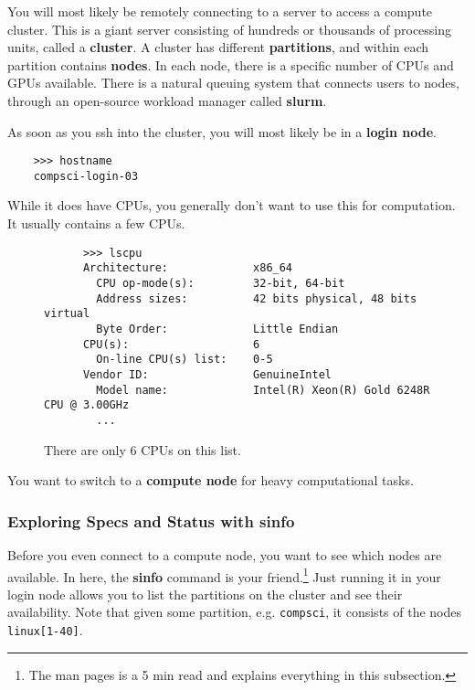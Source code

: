   You will most likely be remotely connecting to a server to access a compute cluster. This is a giant server consisting of hundreds or thousands of processing units, called a \textbf{cluster}. A cluster has different \textbf{partitions}, and within each partition contains \textbf{nodes}. In each node, there is a specific number of CPUs and GPUs available. There is a natural queuing system that connects users to nodes, through an open-source workload manager called \textbf{slurm}. 

  As soon as you ssh into the cluster, you will most likely be in a \textbf{login node}.
  \begin{lstlisting}
    >>> hostname         
    compsci-login-03 
  \end{lstlisting} 

  While it does have CPUs, you generally don't want to use this for computation. It usually contains a few CPUs. 

  \begin{figure}[H]
    \centering 
    \begin{lstlisting}
      >>> lscpu 
      Architecture:             x86_64
        CPU op-mode(s):         32-bit, 64-bit
        Address sizes:          42 bits physical, 48 bits virtual
        Byte Order:             Little Endian
      CPU(s):                   6
        On-line CPU(s) list:    0-5
      Vendor ID:                GenuineIntel
        Model name:             Intel(R) Xeon(R) Gold 6248R CPU @ 3.00GHz    
        ...
    \end{lstlisting}
    \caption{There are only 6 CPUs on this list. } 
  \end{figure}

  You want to switch to a \textbf{compute node} for heavy computational tasks. 

\subsubsection{Exploring Specs and Status with sinfo} 

  Before you even connect to a compute node, you want to see which nodes are available. In here, the \textbf{sinfo} command is your friend.\footnote{The man pages is a 5 min read and explains everything in this subsection.} Just running it in your login node allows you to list the partitions on the cluster and see their availability. Note that given some partition, e.g. \texttt{compsci}, it consists of the nodes \texttt{linux[1-40]}. 

